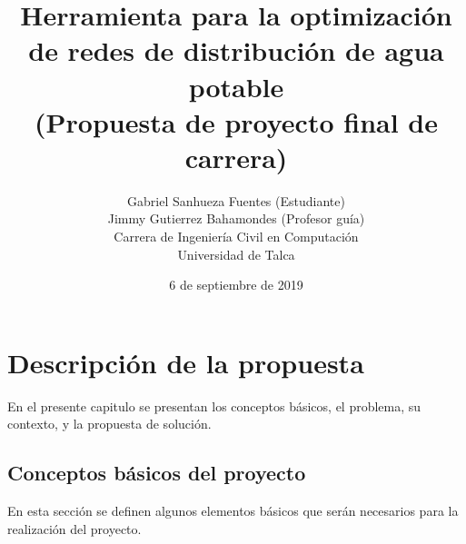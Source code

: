 \documentclass[11pt,letterpaper]{article}
\begin{document}
\pagestyle{empty}

\title{
Herramienta para la optimización de redes de distribución de agua potable\\
(Propuesta de proyecto final de carrera)
}
\author{
Gabriel Sanhueza Fuentes (Estudiante)\\
Jimmy Gutierrez Bahamondes (Profesor guía)\\
Carrera de Ingeniería Civil en Computación\\ 
Universidad de Talca}
\date{6 de septiembre de 2019}

\maketitle


\section{Descripción de la propuesta}


En el presente capitulo se presentan los conceptos básicos, el problema, su contexto, y la propuesta de solución. 

\subsection{Conceptos básicos del proyecto} 

En esta sección se definen algunos elementos básicos que serán necesarios para la realización del proyecto.
\end{document}
